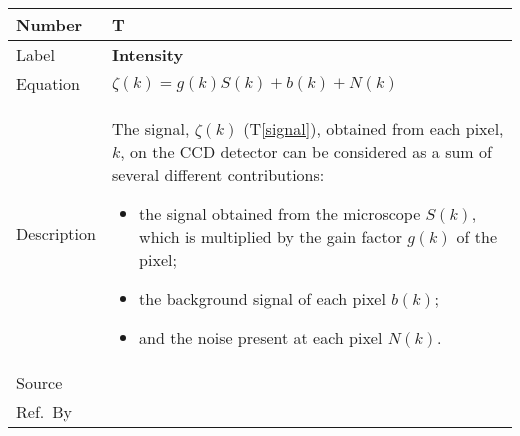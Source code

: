\documentclass[12pt]{article}
\newcommand{\colAwidth}{0.13\textwidth}
\newcommand{\colBwidth}{0.82\textwidth}
\newcounter{theorynum} %
\newcommand{\tref}[1]{T\ref{#1}}
\begin{document}
\noindent
\begin{minipage}{\textwidth}
	\renewcommand*{\arraystretch}{1.5}
	\begin{tabular}{| p{\colAwidth} | p{\colBwidth}|}
		  \hline
		  \rowcolor[gray]{0.9}
		  Number& T{theorynum}\thetheorynum \label{intensity}\\
		  \hline
		  Label&\bf Intensity \\
		  \hline
		  Equation& $\zeta(k) = g(k) S(k) + b(k) + N(k)$ \\
		  \hline
		  Description & The signal, $\zeta(k)$ (\tref{signal}), obtained from each pixel, $k$, on the CCD detector can be considered as a sum of several different contributions: 
		  \begin{itemize}
			\item the signal obtained from the microscope $S(k)$, which is multiplied by the gain factor $g(k)$ of the pixel; 
			\item the background signal of each pixel $b(k)$; 
			\item and the noise present at each pixel $N(k)$.
		  \end{itemize}\\
		  \hline
		  Source & \cite{zuo_electron_2000}
		           \\
		  \hline
		  Ref.\ By & \\
		  \hline
	\end{tabular}
\end{minipage}\\

~\newline
\end{document}
